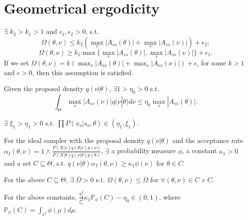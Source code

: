\section{Geometrical ergodicity}
\begin{assumption}
$\exists$ $k_2 > k_1 > 1$ and $\epsilon_1, \epsilon_2 > 0$, s.t. 
$$\Omega(\theta, \nu) \leq k_2 (  \max_s|A_{ss}(\theta)| +  \max_s|A_{ss}(\nu)| ) + \epsilon_2 ;$$
$$\Omega(\theta, \nu) \geq k_1 \max \{ \max_s|A_{ss}(\theta)|, \max_s|A_{ss}(\nu)| \} + \epsilon_1.$$ 
If we set $\Omega(\theta, \nu) = k (  \max_s|A_{ss}(\theta)| +  \max_s|A_{ss}(\nu)| ) + \epsilon$, for some $k > 1$ and $\epsilon > 0$, then this assumption is satisfied.
\end{assumption}

\begin{assumption}
Given the proposal density $q(\nu | \theta)$, $\exists 1 >\eta_0 > 0$ s.t. $$ \int_\Theta \max_s|A_{ss}(\nu)| q(\nu | \theta)d\nu \leq \eta_0 \max_s|A_{ss}(\theta)|.$$
\end{assumption}

\begin{assumption}
$\exists$ $ \xi_1 > \eta_1 > 0$ s.t. $\prod P(x_o | s_o, \theta) \in (\eta_1, \xi_1)$.
\end{assumption}

\begin{assumption}
For the ideal sampler with the proposal density $q(\nu| \theta)$ and the acceptance rate $\alpha_I(\theta, \nu) = 1 \wedge \frac{P(X | \nu)q(\theta| \nu)p(\nu)}{P(X | \theta)q(\nu| \theta)p(\theta)}$, $\exists$ a probability measure $\phi$, a constant $\kappa_1 > 0$ and a set $C \subseteq \Theta$, s.t. $q(\nu | \theta) \alpha_I(\theta, \nu) \geq \kappa_1 \phi(\nu)$ for $\theta \in C$. 
\end{assumption}

\begin{assumption}
For the above $C \subseteq \Theta$, $\exists$ $\bar{\Omega} > 0$ s.t. $\Omega(\theta, \nu)  \leq \bar{\Omega}$ for $\forall (\theta, \nu) \in C \times C$.
\end{assumption}

\begin{assumption}
For the above constants, $\frac{\eta_1^2}{\xi_1^2} \kappa_1 \mathbb{P}_\phi(C)  - \eta_0 \in (0, 1)$, where $\mathbb{P}_\phi(C) = \int_C\phi(\mu)d\mu$.
\end{assumption}

